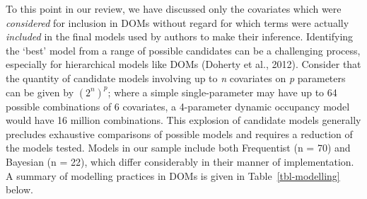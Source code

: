 \documentclass[
]{article}
\begin{document}
To this point in our review, we have discussed only the covariates which
were \emph{considered} for inclusion in DOMs without regard for which
terms were actually \emph{included} in the final models used by authors
to make their inference. Identifying the `best' model from a range of
possible candidates can be a challenging process, especially for
hierarchical models like DOMs (Doherty et al., 2012). Consider that the
quantity of candidate models involving up to \emph{n} covariates on
\emph{p} parameters can be given by \((2^n)^p\); where a simple
single-parameter may have up to 64 possible combinations of 6
covariates, a 4-parameter dynamic occupancy model would have 16 million
combinations. This explosion of candidate models generally precludes
exhaustive comparisons of possible models and requires a reduction of
the models tested. Models in our sample include both Frequentist (n =
70) and Bayesian (n = 22), which differ considerably in their manner of
implementation. A summary of modelling practices in DOMs is given in
Table~\ref{tbl-modelling} below.
\end{document}
